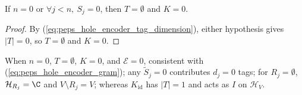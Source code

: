\begin{lemma}
    \label{thm:peps_hole_encoder_zero}
    \leanok
    If $n=0$ or $\forall j<n,\ S_j=0$, then $T=\emptyset$ and $K=0$.
\end{lemma}
\begin{proof}
    \leanok
    By (\ref{eq:peps_hole_encoder_tag_dimension}), either hypothesis gives
    $|T|=0$, so $T=\emptyset$ and $K=0$.
\end{proof}

\begin{remark}
    When $n=0$, $T=\emptyset$, $K=0$, and $\mathcal E=0$, consistent with
    (\ref{eq:peps_hole_encoder_gram}); any $\widetilde S_j=0$ contributes
    $d_j=0$ tags; for $R_j=\emptyset$, $\mathcal H_{R_j}=\C$ and
    $V\setminus R_j=V$; whereas $K_{\mathrm{id}}$ has $|T|=1$ and acts as $I$ on
    $\mathcal H_V$.
\end{remark}
